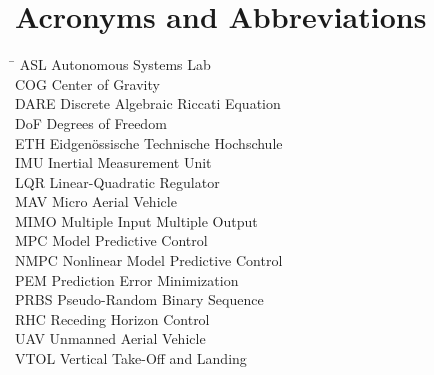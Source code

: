 \section*{Acronyms and Abbreviations}
\begin{tabbing}
 \hspace*{1.6cm}  \= \kill
 ASL \> Autonomous Systems Lab \\[0.5ex]
 COG \> Center of Gravity \\[0.5ex]
 DARE \> Discrete Algebraic Riccati Equation \\[0.5ex]
 DoF \> Degrees of Freedom \\[0.5ex]
 ETH \> Eidgenössische Technische Hochschule \\[0.5ex]
 IMU \> Inertial Measurement Unit \\[0.5ex]
 LQR \> Linear-Quadratic Regulator \\[0.5ex]
 MAV \> Micro Aerial Vehicle \\[0.5ex]
 MIMO \> Multiple Input Multiple Output \\[0.5ex]
 MPC \> Model Predictive Control \\[0.5ex]
 NMPC \> Nonlinear Model Predictive Control \\[0.5ex]
 PEM \> Prediction Error Minimization \\[0.5ex]
 PRBS \> Pseudo-Random Binary Sequence \\[0.5ex]
 RHC \> Receding Horizon Control \\[0.5ex]
 UAV \> Unmanned Aerial Vehicle \\[0.5ex]
 VTOL \> Vertical Take-Off and Landing \\[0.5ex]

\end{tabbing}